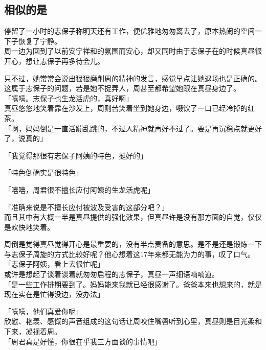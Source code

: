 \subsection{相似的是}

停留了一小时的志保子称明天还有工作，便优雅地匆匆离去了，原本热闹的空间一下子恢复了宁静。\\

周一边为回到了以前安宁祥和的氛围而安心，却又同时由于志保子在的时候真昼很开心，想让志保子再多待会儿。

只不过，她常常会说出狠狠磨削周的精神的发言，感觉早点让她退场也是正确的。这属于志保子的问题，若是她不捉弄人，周甚至都希望她跟在真昼身边了。\\

「嘻嘻。志保子也生龙活虎的，真好啊」\\

真昼悠悠地笑着靠在沙发上，周则苦笑着坐到她身边，啜饮了一口已经冷掉的红茶。\\

「啊，妈妈倒是一直活蹦乱跳的，不过人精神就再好不过了。要是再沉稳点就更好了，说真的」

「我觉得那很有志保子阿姨的特色，挺好的」

「特色倒确实是很特色」

「嘻嘻，周君很不擅长应付阿姨的生龙活虎呢」

「准确来说是不擅长应付被波及受害的这部分吧？」\\

而且其中有大概一半是真昼提供的强化效果，但真昼许是没有那方面的自觉，仅仅是欢快地笑着。

周倒是觉得真昼觉得开心是最重要的，没有半点责备的意思。是不是还是锻炼一下与志保子周旋的方式比较好呢？他心想着这17年来都无能为力的事，叹了口气。\\

「志保子阿姨，看上去很忙呢」\\

或许是想起了谈着谈着就匆匆启程的志保子，真昼一声细语喃喃道。\\

「是一些工作排期要到了。妈妈能来我就已经很感谢了。爸爸本来也想来的，就是现在实在是忙得没边，没办法」

「嘻嘻，他们真爱你呢」\\

欣慰、艳羡、感慨的声音组成的这句话让周咬住嘴唇听到心里，真昼则是目光柔和下来，凝视着周。\\

「周君真是好懂，你很在乎我三方面谈的事情吧」\\

